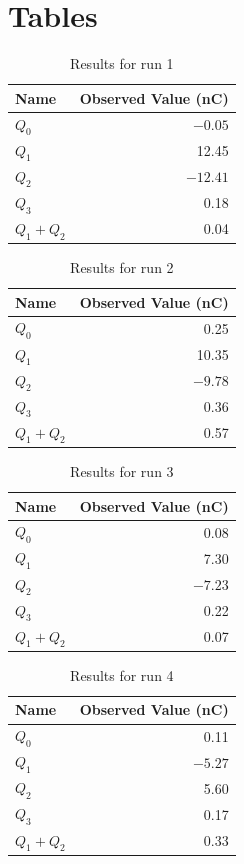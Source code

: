 \section{Tables}
%
\begin{table}[ht]
	\centering
	\begin{tabular}{|l|r|}
		\hline
		Name & Observed Value (nC) \\
		\hline
		$Q_{0}$ & $-0.05$ \\
		$Q_{1}$ & 12.45 \\
		$Q_{2}$ & $-12.41$ \\
		$Q_{3}$ & 0.18 \\
		$Q_{1} + Q_{2}$ & 0.04 \\
		\hline
	\end{tabular}
	\caption{Results for run 1}
	\label{table_01_run_1}
\end{table}
%
\begin{table}[ht]
	\centering
	\begin{tabular}{|l|r|}
		\hline
		Name & Observed Value (nC) \\
		\hline
		$Q_{0}$ & 0.25 \\
		$Q_{1}$ & 10.35 \\
		$Q_{2}$ & $-9.78$ \\
		$Q_{3}$ & 0.36 \\
		$Q_{1} + Q_{2}$ & 0.57 \\
		\hline
	\end{tabular}
	\caption{Results for run 2}
	\label{table_01_run_2}
\end{table}
%
\begin{table}[ht]
	\centering
	\begin{tabular}{|l|r|}
		\hline
		Name & Observed Value (nC) \\
		\hline
		$Q_{0}$ & 0.08 \\
		$Q_{1}$ & 7.30 \\
		$Q_{2}$ & $-7.23$ \\
		$Q_{3}$ & 0.22 \\
		$Q_{1} + Q_{2}$ & 0.07 \\
		\hline
	\end{tabular}
	\caption{Results for run 3}
	\label{table_01_run_3}
\end{table}
%
\begin{table}[ht]
	\centering
	\begin{tabular}{|l|r|}
		\hline
		Name & Observed Value (nC) \\
		\hline
		$Q_{0}$ & 0.11 \\
		$Q_{1}$ & $-5.27$ \\
		$Q_{2}$ & 5.60 \\
		$Q_{3}$ & 0.17 \\
		$Q_{1} + Q_{2}$ & 0.33 \\
		\hline
	\end{tabular}
	\caption{Results for run 4}
	\label{table_01_run_4}
\end{table}
